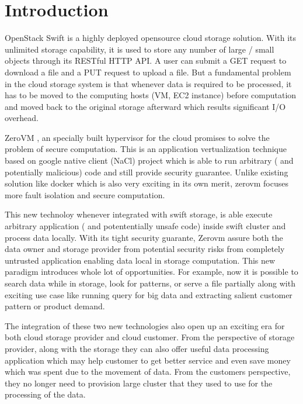 \section{Introduction}
OpenStack  Swift is a highly deployed opensource cloud storage solution. With its unlimited storage capability, it is used to store any number of large / small objects through its  RESTful HTTP API. A user can  submit a GET request to download a  file and a PUT request to upload a file. But a fundamental problem in the cloud storage system is  that whenever data is required to be processed, it has to be moved to the computing hosts (VM, EC2 instance) before computation and moved back to the original storage afterward which  results significant I/O overhead. 



ZeroVM \cite{zerovm}, an specially built hypervisor for the cloud promises to solve the problem of secure computation. This is an application vertualization technique based on google native client (NaCl) project \cite{nacl} which is able to run arbitrary ( and potentially malicious) code  and still provide security guarantee. Unlike existing solution like docker \cite{docker} which is also very exciting in its own merit, zerovm focuses more fault isolation and secure computation. 


This new technoloy whenever integrated with  swift storage, is able execute arbitrary application ( and potententially unsafe code) inside swift cluster and process data locally. With its tight security guarante, Zerovm assure both the data owner and storage provider  from potential security risks from completely untrusted application enabling data local in storage computation. This new paradigm introduces whole lot of opportunities. For example, now it is possible to search data while in storage, look for patterns, or serve a file partially along with exciting use case like  running query for big data and  extracting salient customer pattern or product demand. 

The integration of these two new technologies also open up an exciting era for both cloud storage provider and cloud customer. From the perspective of storage provider, along with the storage they can also offer useful data processing application  which may help customer to get better service and even save money which was spent due to the movement of data. From the customers perspective, they no longer need to provision large cluster that they used to use for the processing of the data.  

